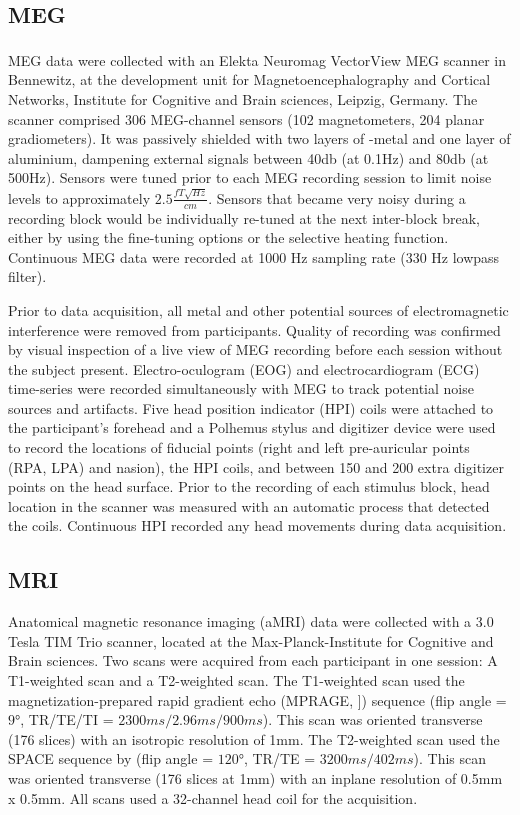 \subsection {MEG}
MEG data were collected with an Elekta Neuromag VectorView\textsuperscript{\textregistered} MEG scanner in Bennewitz, at the development unit for Magnetoencephalography and Cortical Networks, Institute for Cognitive and Brain sciences, Leipzig, Germany.
The scanner comprised 306 MEG-channel sensors (102 magnetometers, 204 planar gradiometers).
It was passively shielded with two layers of \si{\micro}-metal and one layer of aluminium, dampening external signals between 40db (at 0.1Hz) and 80db (at 500Hz).
Sensors were tuned prior to each MEG recording session to limit noise levels to approximately $2.5 \frac{fT\sqrt{Hz}}{cm}$.
Sensors that became very noisy during a recording block would be individually re-tuned at the next inter-block break, either by using the fine-tuning options or the selective heating function.
Continuous MEG data were recorded at 1000 Hz sampling rate (330 Hz lowpass filter).

Prior to data acquisition, all metal and other potential sources of electromagnetic interference were removed from participants.
Quality of recording was confirmed by visual inspection of a live view of MEG recording before each session without the subject present.
Electro-oculogram (EOG) and electrocardiogram (ECG) time-series were recorded simultaneously with MEG to track potential noise sources and artifacts.
Five head position indicator (HPI) coils were attached to the participant's forehead and a Polhemus stylus and digitizer device were used to record the locations of fiducial points (right and left pre-auricular points (RPA, LPA) and nasion), the HPI coils, and between 150 and 200 extra digitizer points on the head surface.
Prior to the recording of each stimulus block, head location in the scanner was measured with an automatic process that detected the coils.
Continuous HPI recorded any head movements during data acquisition.

\subsection {MRI}
Anatomical magnetic resonance imaging (aMRI) data were collected with a 3.0 Tesla TIM Trio scanner, located at the Max-Planck-Institute for Cognitive and Brain sciences.
Two scans were acquired from each participant in one session: A T1-weighted scan and a T2-weighted scan.
The T1-weighted scan used the magnetization-prepared rapid gradient echo (MPRAGE, \cite{3.2.mprage}]) sequence (flip angle = $9\si{\degree}$, TR/TE/TI = $2300ms/2.96ms/900ms$).
This scan was oriented transverse (176 slices) with an isotropic resolution of 1mm.
The T2-weighted scan used the SPACE sequence by \cite{3.2.space} (flip angle = $120\si{\degree}$, TR/TE = $3200ms/402ms$).
This scan was oriented transverse (176 slices at 1mm) with an inplane resolution of 0.5mm x 0.5mm.
All scans used a 32-channel head coil for the acquisition.


